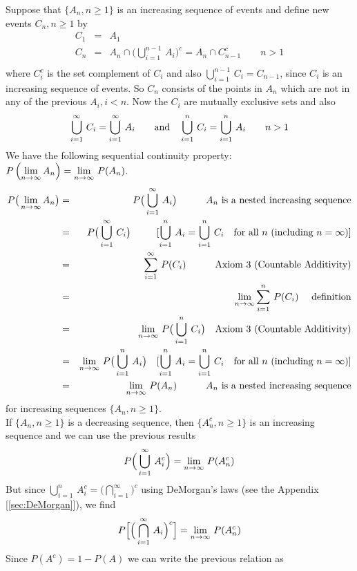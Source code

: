 Suppose that $\{A_n,n\ge 1\}$ is an increasing sequence of events and define new events $C_n, n\ge1$ by
\begin{eqnarray*}
C_1 &=& A_1 \\
C_n &=&  A_n \cap \big(\bigcup\limits_{i=1}^{n-1}\, A_i \big)^c = A_n \cap C^c_{n-1}\quad\quad n > 1 \\ 
\end{eqnarray*}where $C_i^c$ is the set complement of $C_i$ and also $\bigcup\limits_{i=1}^{n-1}\, C_i = C_{n-1}$, since $C_i$ is an increasing sequence of events. So $C_n$ consists of the points in $A_n$ which are not in any of the previous $A_i, i<n$.  Now the $C_i$ are mutually exclusive sets and also 
$$\bigcup\limits_{i=1}^\infty\, C_i = \bigcup\limits_{i=1}^\infty\, A_i\quad\quad\hbox{and}\quad \bigcup\limits_{i=1}^n\, C_i = \bigcup\limits_{i=1}^n\, A_i\quad\quad n>1$$ We have the following sequential continuity property:
$\displaystyle{P\left( \lim_{n\rightarrow\infty} A_n\right) =  \lim_{n\rightarrow\infty}\, P(A_n)}$.
\begin{eqnarray*}
P\big( \lim_{n\rightarrow\infty} A_n \big) &=& P\big(\bigcup\limits_{i=1}^\infty\, A_i \big) \quad\quad\hbox{~~~$A_n$ is a nested increasing sequence}\\
&=& P\big(\bigcup\limits_{i=1}^\infty\, C_i \big) \quad \quad ~~[\displaystyle{\bigcup\limits_{i=1}^n\, A_i = \bigcup\limits_{i=1}^n\, C_i}\quad\hbox{for all $n$ (including $n=\infty$)}]\\
&=& \sum_{i=1}^\infty\, P(C_i)\quad\quad\hbox{~~~Axiom 3 (Countable Additivity)} \\
&=& \lim_{n\rightarrow\infty} \sum_{i=1}^n\,P(C_i) \quad \hbox{~definition}\\
&=& \lim_{n\rightarrow\infty}\, P\big(\bigcup\limits_{i=1}^n\, C_i \big)\hbox{~~~Axiom 3 (Countable Additivity)}\\
&=& \lim_{n\rightarrow\infty}\, P\big(\bigcup\limits_{i=1}^n\, A_i \big)\quad [\bigcup\limits_{i=1}^n\, A_i = \bigcup\limits_{i=1}^n\, C_i\quad\hbox{for all $n$ (including $n=\infty$)}]\\\
&=& \lim_{n\rightarrow\infty}\, P(A_n) \quad\quad\hbox{~~~$A_n$ is a nested increasing sequence}
\end{eqnarray*} for increasing sequences $\{ A_n, n\ge1 \}$. \\

If $\{A_n, n\ge 1 \}$ is a decreasing sequence, then $\{ A_n^c, n\ge 1\}$ is an increasing sequence and we can use the previous results 
$$P\Big(\bigcup\limits_{i=1}^\infty\, A_i^c   \Big)  = \lim_{n\rightarrow\infty}\, P(A_n^c)$$ But since $\bigcup\limits_{i=1}^n\, A_i^c = \big(\bigcap\limits_{i=1}^\infty \big)^c$ using DeMorgan's laws (see the Appendix [\ref{sec:DeMorgan}]), we find
$$P\Big[ \Big( \bigcap\limits_{i=1}^\infty\, A_i  \Big)^c  \Big] = \lim_{n\rightarrow\infty}\, P(A_n^c)$$ Since $P(A^c) = 1 - P(A)$ we can write the previous relation as 

